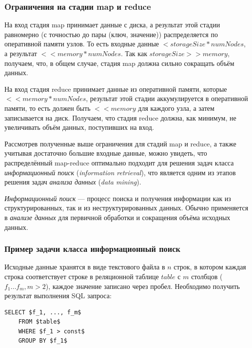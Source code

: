 \documentclass[12pt,a4paper,oneside]{extarticle}
\begin{document}
        \subsubsection{Oграничения на стадии map и reduce}
            На вход стадия map принимает данные с диска, а результат этой стадии равномерно (с точностью до пары (ключ, значение)) распределяется по оперативной памяти узлов. То есть входные данные $<storageSize*numNodes$, а результат $<< memory*numNodes$. Так как $storageSize >> memory$, получаем, что, в общем случае, стадия map должна сильно сокращать объём данных.

            На вход стадия reduce принимает данные из оперативной памяти, которые $<< memory*numNodes$, результат этой стадии аккумулируется в оперативной памяти, то есть должен быть $<<memory$ для каждого узла, а затем записывается на диск. Получаем, что стадия reduce должна, как минимум, не увеличивать объём данных, поступивших на вход.

            Рассмотрев полученные выше ограничения для стадий map и reduce, а также учитывая достаточно большие входные данные, можно увидеть, что распределённый map-reduce оптимально подходит для решения задач класса {\it информационный поиск} ({\it information retrieval}), что является одним из этапов решения задач {\it анализа данных} ({\it data mining}).

            {\it Информационный поиск} --- процесс поиска и получения информации как из структурированных, так и из неструктурированных данных. Обычно применяется в {\it анализе данных} для первичной обработки и сокращения объёма исходных данных. 

        \clearpage

        \subsubsection{Пример задачи класса информационный поиск}

            Исходные данные хранятся в виде текстового файла в $n$ строк, в котором каждая строка соответствует строке в реляционной таблице $table$ с $m$ столбцов ($f_1...f_m, m>2$), каждое значение записано через пробел. Необходимо получить результат выполнения SQL запроса:
            \lstset{language=SQL}
            \begin{lstlisting}[mathescape] 
    SELECT $f_1, ..., f_m$
    FROM $table$
    WHERE $f_1 > const$
    GROUP BY $f_1$
            \end{lstlisting}
\end{document}
